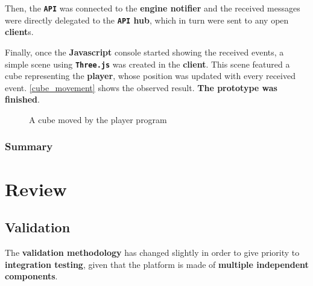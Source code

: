 \documentclass[a4paper,11pt,titlepage,abstract,numbers=noenddot,automark,mnsy,intlimits,rgb,dvipsnames]{report}
\begin{document}
Then, the \textbf{\texttt{API}} was connected to the \textbf{engine notifier} and the received messages were directly delegated to the \textbf{\texttt{API} hub},
which in turn were sent to any open \textbf{client}s.

Finally, once the \textbf{Javascript} console started showing the received events, a simple scene using \textbf{\texttt{Three.js}} was created in the
\textbf{client}. This scene featured a cube representing the \textbf{player}, whose position was updated with every received event.
\autoref{cube_movement} shows the observed result. \textbf{The prototype was finished}.
\begin{figure}[H]
\begin{center}
\noindent{}
\end{center}
\caption{A cube moved by the player program}
\label{cube_movement}
\end{figure}
\section{Summary}
\clearpage
\part{Review}
\chapter{Validation}
\label{methodology}
The \textbf{validation methodology} has changed slightly in order to give priority to \textbf{integration testing}, given that
the platform is made of \textbf{multiple independent components}.
\end{document}
